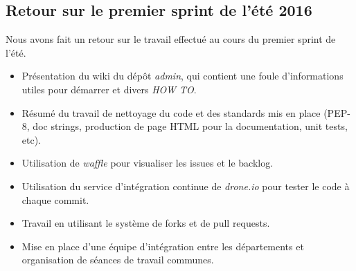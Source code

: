 \documentclass[12pt,letterpaper,twoside]{article}
\begin{document}
\subsection*{Retour sur le premier sprint de l'été 2016}
Nous avons fait un retour sur le travail effectué au cours du premier sprint de l'été.
\begin{itemize}
	\item Présentation du wiki du dépôt \emph{admin}, qui contient une foule d'informations utiles pour démarrer et divers \emph{HOW TO}.
	\item Résumé du travail de nettoyage du code et des standards mis en place (PEP-8, doc strings, production de page HTML pour la documentation, unit tests, etc).	
	\item Utilisation de \emph{waffle} pour visualiser les issues et le backlog.
	\item Utilisation du service d'intégration continue de \emph{drone.io} pour tester le code à chaque commit.
	\item Travail en utilisant le système de forks et de pull requests.
	\item Mise en place d'une équipe d'intégration entre les départements et organisation de séances de travail communes. 
\end{itemize}
\end{document}
